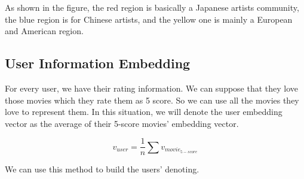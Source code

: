 \documentclass[11pt,a4paper]{article}
\begin{document}
As shown in the figure, the red region is basically a Japanese artists
community, the blue region is for Chinese artists, and the yellow one is
mainly a European and American region.

\hypertarget{header-n152}{%
\subsection{User Information Embedding}\label{header-n152}}

For every user, we have their rating information. We can suppose that
they love those movies which they rate them as 5 score. So we can use
all the movies they love to represent them. In this situation, we will
denote the user embedding vector as the average of their 5-score movies'
embedding vector.

\[v_{user} = \dfrac{1}{n}\sum v_{movie_{5-score}}\]

We can use this method to build the users' denoting.



\end{document}
